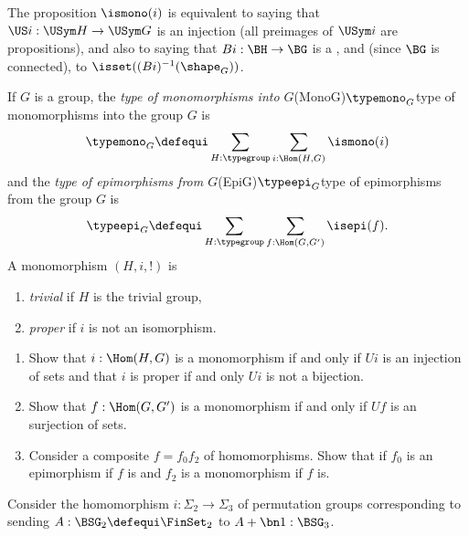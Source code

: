 The proposition $\ismono(i)$ is equivalent to saying that $\US i:\USym H\to \USym G$ is an injection (all preimages of $\USym i$ are propositions), and also to saying that $B i:\BH\to\BG$ is a \covering, and (since $\BG$ is connected), to $\isset((Bi)^{-1}(\shape_G))$.
\begin{definition}
  \label{def:typeofmono}
  If $G$ is a group, the \emph{type of monomorphisms into $G$}\glossary(MonoG){$\protect{\typemono_G}$}{type of monomorphisms into the group $G$} is
  $$\typemono_G\defequi\sum_{H:\typegroup}\sum_{i:\Hom(H,G)}\ismono(i)$$
  and the \emph{type of epimorphisms from $G$}\glossary(EpiG){$\protect{\typeepi_G}$}{type of epimorphisms from the group $G$} is
  $$\typeepi_G\defequi\sum_{H:\typegroup}\sum_{f:\Hom(G,G')}\isepi(f).$$
  A monomorphism $(H,i,!)$ is
      \begin{enumerate}
      \item \emph{trivial} if $H$ is the trivial group, %
      \item \emph{proper} if $i$ is not an isomorphism.\qedhere
      \end{enumerate}
    \end{definition}
    \begin{exercise}
      \begin{enumerate}
      \item Show that $i:\Hom(H,G)$ is a monomorphism if and only if $Ui$ is an injection of sets and that $i$ is proper if and only $Ui$ is not a bijection.
      \item Show that $f:\Hom(G,G')$ is a monomorphism if and only if $Uf$ is an surjection of sets.
      \item Consider a composite $f=f_0f_2$ of homomorphisms.  Show that if $f_0$ is an epimorphism if $f$ is and $f_2$ is a monomorphism if $f$ is.\qedhere
      \end{enumerate}

      
    \end{exercise}

\begin{example}
  \label{ex:sigma2inSigma3}
Consider the  homomorphism $i:\Sigma_2\to\Sigma_3$ of permutation groups corresponding to sending $A:\BSG_2\defequi \FinSet_2$ to $A+\bn1:\BSG_3$.
\end{example}

